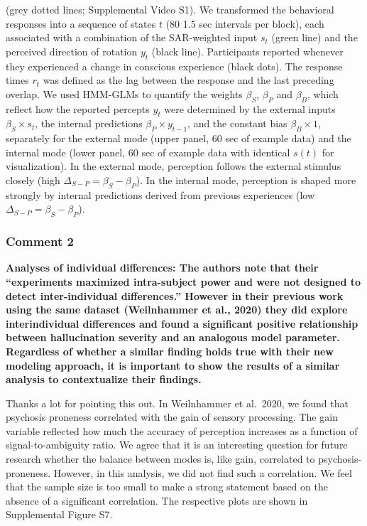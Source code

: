 \documentclass[
]{article}
\begin{document}
\begin{itemize}
  (grey dotted lines; Supplemental Video S1). We transformed the
  behavioral responses into a sequence of states \(t\) (80 1.5 sec
  intervals per block), each associated with a combination of the
  SAR-weighted input \(s_t\) (green line) and the perceived direction of
  rotation \(y_t\) (black line). Participants reported whenever they
  experienced a change in conscious experience (black dots). The
  response times \(r_t\) was defined as the lag between the response and
  the last preceding overlap. We used HMM-GLMs to quantify the weights
  \(\beta_S\), \(\beta_P\) and \(\beta_B\), which reflect how the
  reported percepts \(y_t\) were determined by the external inputs
  \(\beta_S \times s_t\), the internal predictions
  \(\beta_P \times y_{t-1}\), and the constant bias
  \(\beta_B \times 1\), separately for the external mode (upper panel,
  60 sec of example data) and the internal mode (lower panel, 60 sec of
  example data with identical \(s(t)\) for visualization). In the
  external mode, perception follows the external stimulus closely (high
  \(\Delta_{S-P} = \beta_S - \beta_P\)). In the internal mode,
  perception is shaped more strongly by internal predictions derived
  from previous experiences (low \(\Delta_{S-P} = \beta_S - \beta_P\)).
\end{itemize}

\subsubsection{Comment 2}\label{comment-2-3}

\textbf{Analyses of individual differences: The authors note that their
``experiments maximized intra-subject power and were not designed to
detect inter-individual differences.'' However in their previous work
using the same dataset (Weilnhammer et al., 2020) they did explore
interindividual differences and found a significant positive
relationship between hallucination severity and an analogous model
parameter. Regardless of whether a similar finding holds true with their
new modeling approach, it is important to show the results of a similar
analysis to contextualize their findings.}

Thanks a lot for pointing this out. In Weilnhammer et al.~2020, we found
that psychosis proneness correlated with the gain of sensory processing.
The gain variable reflected how much the accuracy of perception
increases as a function of signal-to-ambiguity ratio. We agree that it
is an interesting question for future research whether the balance
between modes is, like gain, correlated to psychosis-proneness. However,
in this analysis, we did not find such a correlation. We feel that the
sample size is too small to make a strong statement based on the absence
of a significant correlation. The respective plots are shown in
Supplemental Figure S7.
\end{document}

